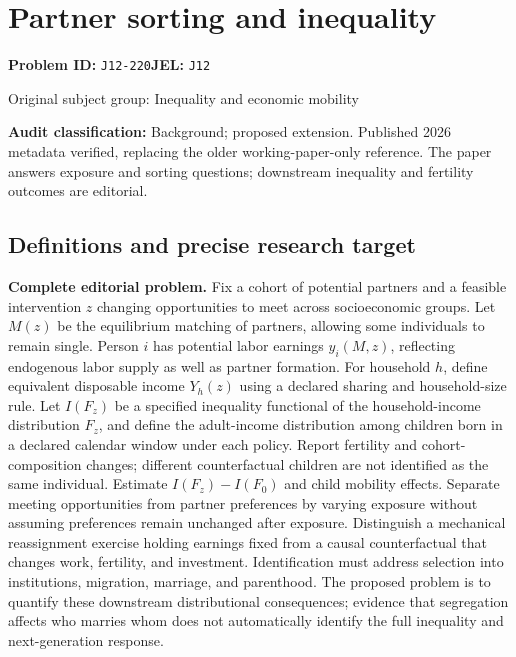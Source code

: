 \documentclass[11pt,a4paper]{article}
\begin{document}
\section*{Partner sorting and inequality}
\textbf{Problem ID:} \texttt{J12-220}\quad \textbf{JEL:} \texttt{J12}\par
\label{problem:OP-0367}
{\sffamily\small\color{muted}Original subject group: Inequality and economic mobility\par}
\label{definitions:problem:30007649}
\textbf{Audit classification:} Background; proposed extension. Published 2026 metadata verified, replacing the older working-paper-only reference. The paper answers exposure and sorting questions; downstream inequality and fertility outcomes are editorial.
\subsection*{Definitions and precise research target}
\textbf{Complete editorial problem.} Fix a cohort of potential partners and a feasible intervention \(z\) changing opportunities to meet across socioeconomic groups. Let \(M(z)\) be the equilibrium matching of partners, allowing some individuals to remain single. Person \(i\) has potential labor earnings \(y_i(M,z)\), reflecting endogenous labor supply as well as partner formation. For household \(h\), define equivalent disposable income \(Y_h(z)\) using a declared sharing and household-size rule. Let \(I(F_z)\) be a specified inequality functional of the household-income distribution \(F_z\), and define the adult-income distribution among children born in a declared calendar window under each policy. Report fertility and cohort-composition changes; different counterfactual children are not identified as the same individual. Estimate \(I(F_z)-I(F_0)\) and child mobility effects. Separate meeting opportunities from partner preferences by varying exposure without assuming preferences remain unchanged after exposure. Distinguish a mechanical reassignment exercise holding earnings fixed from a causal counterfactual that changes work, fertility, and investment. Identification must address selection into institutions, migration, marriage, and parenthood. The proposed problem is to quantify these downstream distributional consequences; evidence that segregation affects who marries whom does not automatically identify the full inequality and next-generation response.
\end{document}
